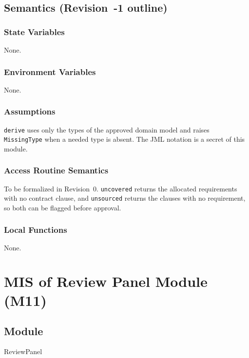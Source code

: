 \documentclass[12pt, titlepage]{article}
\begin{document}
\subsection{Semantics (Revision~-1 outline)}

\subsubsection{State Variables}

None.

\subsubsection{Environment Variables}

None.

\subsubsection{Assumptions}

\texttt{derive} uses only the types of the approved domain model and raises
\texttt{MissingType} when a needed type is absent. The JML notation is a secret
of this module.

\subsubsection{Access Routine Semantics}

To be formalized in Revision~0. \texttt{uncovered} returns the allocated
requirements with no contract clause, and \texttt{unsourced} returns the clauses
with no requirement, so both can be flagged before approval.

\subsubsection{Local Functions}

None.

\newpage
\section{MIS of Review Panel Module (M11)} \label{MISReview}

\subsection{Module}

ReviewPanel
\end{document}
